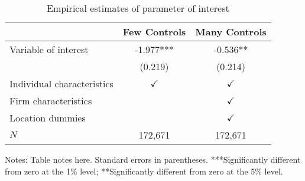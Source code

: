 \documentclass[12pt,english]{article}
\begin{document}
\begin{table}[ht]
\caption{Empirical estimates of parameter of interest}
\label{tab:estimates} 
\centering
\begin{threeparttable}
\begin{tabular}{lcc}
\toprule
                            & Few Controls    & Many Controls \\
\midrule
Variable of interest        & -1.977***       & -0.536**    \\
                            & (0.219)         & (0.214)     \\
Individual characteristics  & $\checkmark$    & $\checkmark$\\
Firm characteristics        &                 & $\checkmark$\\
Location dummies            &                 & $\checkmark$\\
\midrule
$N$                         & 172,671         & 172,671      \\
\bottomrule
\end{tabular}
\footnotesize Notes: Table notes here. Standard errors in parentheses. ***Significantly different from zero at the 1\% level; **Significantly different from zero at the 5\% level.
\end{threeparttable}
\end{table}
\end{document}
